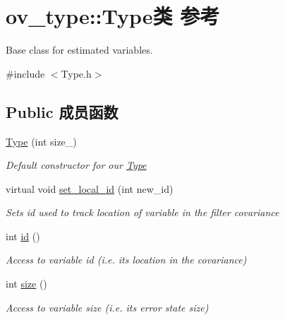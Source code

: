 \hypertarget{classov__type_1_1Type}{}\section{ov\+\_\+type\+:\+:Type类 参考}
\label{classov__type_1_1Type}


Base class for estimated variables.  




{\ttfamily \#include $<$Type.\+h$>$}

\subsection*{Public 成员函数}
\begin{DoxyCompactItemize}
\item 
\hyperlink{classov__type_1_1Type_a512525c192c9bd721e13eef0cb707496}{Type} (int size\+\_\+)
\begin{DoxyCompactList}\small\item\em Default constructor for our \hyperlink{classov__type_1_1Type}{Type} \end{DoxyCompactList}\item 
virtual void \hyperlink{classov__type_1_1Type_a52cb2fe6e25dbe8875da3fd618cf0b61}{set\+\_\+local\+\_\+id} (int new\+\_\+id)
\begin{DoxyCompactList}\small\item\em Sets id used to track location of variable in the filter covariance \end{DoxyCompactList}\item 
\mbox{\label{classov__type_1_1Type_a3a23de9d85dd9a503fd72c54b948f89c}} 
int \hyperlink{classov__type_1_1Type_a3a23de9d85dd9a503fd72c54b948f89c}{id} ()
\begin{DoxyCompactList}\small\item\em Access to variable id (i.\+e. its location in the covariance) \end{DoxyCompactList}\item 
\mbox{\label{classov__type_1_1Type_a21e2cf87dcb51a7456d9d94d4e178fae}} 
int \hyperlink{classov__type_1_1Type_a21e2cf87dcb51a7456d9d94d4e178fae}{size} ()
\begin{DoxyCompactList}\small\item\em Access to variable size (i.\+e. its error state size) \end{DoxyCompactList}\item 

\end{DoxyCompactItemize}

